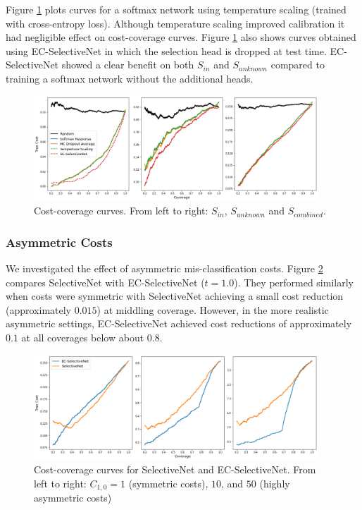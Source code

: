 Figure \ref{fig:dataset_splits} plots curves for a softmax network using temperature scaling (trained with cross-entropy loss). Although temperature scaling improved calibration it had negligible effect on cost-coverage curves.  Figure \ref{fig:dataset_splits} also shows curves obtained using EC-SelectiveNet in which the selection head is dropped at test time. EC-SelectiveNet showed a clear benefit on both $S_{in}$ and $S_{unknown}$ compared to training a softmax network without the additional heads.

\begin{figure}[h]
	\centering
	\includegraphics[width=0.95\textwidth]{images/datasets_v2.png}
	\caption{Cost-coverage curves. From left to right: \(S_{in}\), \(S_{unknown}\) and \(S_{combined}\).}
	\label{fig:dataset_splits}
\end{figure}

\subsubsection{Asymmetric Costs}
We investigated the effect of asymmetric mis-classification costs. Figure \ref{fig:sn_costs} compares SelectiveNet with EC-SelectiveNet ($t=1.0$). They performed similarly when costs were symmetric with SelectiveNet achieving a small cost reduction (approximately $0.015$) at middling coverage. However, in the more realistic asymmetric settings, EC-SelectiveNet achieved cost reductions of approximately $0.1$ at all coverages below about $0.8$.

\begin{figure}[h]
	\centering
	\includegraphics[width=0.95\textwidth]{images/selectivenet_cost.png}
	\caption{Cost-coverage curves for SelectiveNet and EC-SelectiveNet. From left to right: $C_{1,0}=1$ (symmetric costs), $10$, and $50$ (highly asymmetric costs)}
	\label{fig:sn_costs}
\end{figure}

